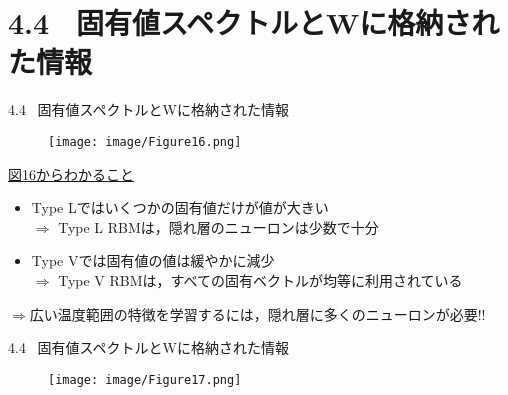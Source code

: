 \documentclass[dvipdfmx,8pt]{beamer}
\begin{document}
\section{4.4 \ 固有値スペクトルとWに格納された情報}
\begin{frame}[t]{4.4 \ 固有値スペクトルとWに格納された情報}
  \begin{figure}
    \begin{center}
      \texttt{[image: image/Figure16.png]}
    \end{center}
  \end{figure}
  \underline{図16からわかること}
  \vspace{0.2cm}
  \begin{itemize}
    \item Type Lではいくつかの固有値だけが値が大きい\\
          \vspace{0.2cm}
          $\Rightarrow$ Type L RBMは，隠れ層のニューロンは少数で十分
    \item Type Vでは固有値の値は緩やかに減少\\
          \vspace{0.2cm}
          $\Rightarrow$ Type V RBMは，すべての固有ベクトルが均等に利用されている
  \end{itemize}
  \vspace{0.2cm}
  $\Rightarrow$広い温度範囲の特徴を学習するには，隠れ層に多くのニューロンが必要!!
\end{frame}

\begin{frame}[t]{4.4 \ 固有値スペクトルとWに格納された情報}
  \begin{figure}
    \begin{center}
      \texttt{[image: image/Figure17.png]}
    \end{center}
  \end{figure}
\end{frame}
\end{document}
